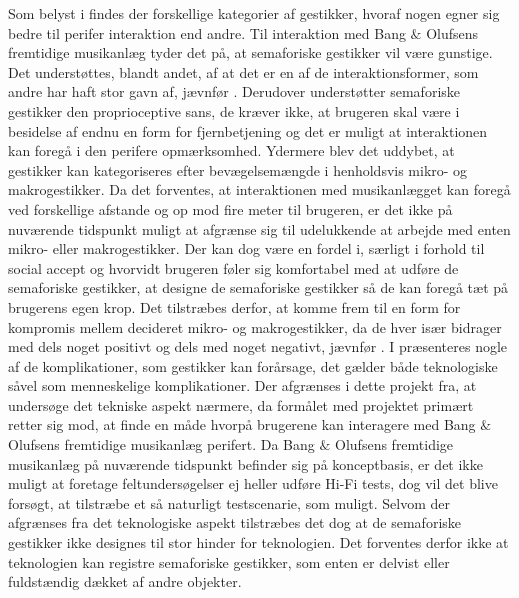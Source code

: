 Som belyst i  findes der forskellige kategorier af gestikker, hvoraf nogen egner sig bedre til perifer interaktion end andre. Til interaktion med Bang $\&$ Olufsens fremtidige musikanlæg tyder det på, at semaforiske gestikker vil være gunstige. Det understøttes, blandt andet, af at det er en af de interaktionsformer, som andre har haft stor gavn af, jævnfør . Derudover understøtter semaforiske gestikker den proprioceptive sans, de kræver ikke, at brugeren skal være i besidelse af endnu en form for fjernbetjening og det er muligt at interaktionen kan foregå i den perifere opmærksomhed. Ydermere blev det uddybet, at gestikker kan kategoriseres efter bevægelsemængde i henholdsvis mikro- og makrogestikker. Da det forventes, at interaktionen med musikanlægget kan foregå ved forskellige afstande og op mod fire meter til brugeren, er det ikke på nuværende tidspunkt muligt at afgrænse sig til udelukkende at arbejde med enten mikro- eller makrogestikker. Der kan dog være en fordel i, særligt i forhold til social accept og hvorvidt brugeren føler sig komfortabel med at udføre de semaforiske gestikker, at designe de semaforiske gestikker så de kan foregå tæt på brugerens egen krop. Det tilstræbes derfor, at komme frem til en form for kompromis mellem decideret mikro- og makrogestikker, da de hver især bidrager med dels noget positivt og dels med noget negativt, jævnfør .\blankline
%
I  præsenteres nogle af de komplikationer, som gestikker kan forårsage, det gælder både teknologiske såvel som menneskelige komplikationer. Der afgrænses i dette projekt fra, at undersøge det tekniske aspekt nærmere, da formålet med projektet primært retter sig mod, at finde en måde hvorpå brugerene kan interagere med Bang $\&$ Olufsens fremtidige musikanlæg perifert. Da Bang $\&$ Olufsens fremtidige musikanlæg på nuværende tidspunkt befinder sig på konceptbasis, er det ikke muligt at foretage feltundersøgelser ej heller udføre Hi-Fi tests, dog vil det blive forsøgt, at tilstræbe et så naturligt testscenarie, som muligt. Selvom der afgrænses fra det teknologiske aspekt tilstræbes det dog at de semaforiske gestikker ikke designes til stor hinder for teknologien. Det forventes derfor ikke at teknologien kan registre semaforiske gestikker, som enten er delvist eller fuldstændig dækket af andre objekter.  

